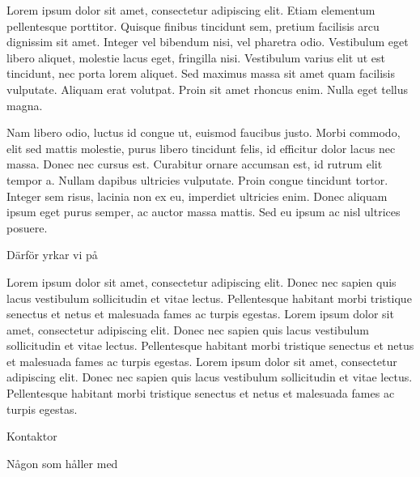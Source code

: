 \documentclass[../_main/handlingar.tex]{subfiles}
\begin{document}

Lorem ipsum dolor sit amet, consectetur adipiscing elit. Etiam elementum pellentesque porttitor. Quisque finibus tincidunt sem, pretium facilisis arcu dignissim sit amet. Integer vel bibendum nisi, vel pharetra odio. Vestibulum eget libero aliquet, molestie lacus eget, fringilla nisi. Vestibulum varius elit ut est tincidunt, nec porta lorem aliquet. Sed maximus massa sit amet quam facilisis vulputate. Aliquam erat volutpat. Proin sit amet rhoncus enim. Nulla eget tellus magna.

Nam libero odio, luctus id congue ut, euismod faucibus justo. Morbi commodo, elit sed mattis molestie, purus libero tincidunt felis, id efficitur dolor lacus nec massa. Donec nec cursus est. Curabitur ornare accumsan est, id rutrum elit tempor a. Nullam dapibus ultricies vulputate. Proin congue tincidunt tortor. Integer sem risus, lacinia non ex eu, imperdiet ultricies enim. Donec aliquam ipsum eget purus semper, ac auctor massa mattis. Sed eu ipsum ac nisl ultrices posuere.

Därför yrkar vi på
\begin{attsatser}
    \att Lorem ipsum dolor sit amet, consectetur adipiscing elit. Donec nec sapien quis lacus vestibulum sollicitudin et vitae lectus. Pellentesque habitant morbi tristique senectus et netus et malesuada fames ac turpis egestas.
    \att Lorem ipsum dolor sit amet, consectetur adipiscing elit. Donec nec sapien quis lacus vestibulum sollicitudin et vitae lectus. Pellentesque habitant morbi tristique senectus et netus et malesuada fames ac turpis egestas.
    \att Lorem ipsum dolor sit amet, consectetur adipiscing elit. Donec nec sapien quis lacus vestibulum sollicitudin et vitae lectus. Pellentesque habitant morbi tristique senectus et netus et malesuada fames ac turpis egestas.
\end{attsatser}

\begin{signatures}{2}
    \mvh
    \signature{Erik Månsson}{Kontaktor}
    \signature{Måns Eriksson}{Någon som håller med}
\end{signatures}
\end{document}
